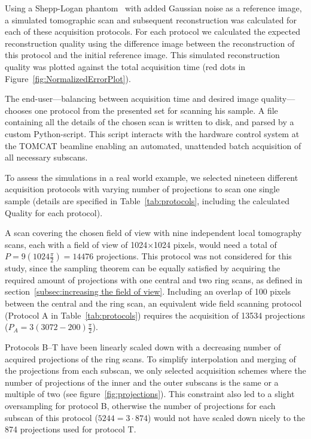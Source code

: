 Using a Shepp-Logan phantom~\cite{Shepp1974} with added Gaussian noise as a reference image, a simulated tomographic scan and subsequent reconstruction was calculated for each of these acquisition protocols. For each protocol we calculated the expected reconstruction quality using the difference image between the reconstruction of this protocol and the initial reference image. This simulated reconstruction quality was plotted against the total acquisition time (red dots in Figure~\ref{fig:NormalizedErrorPlot}).

The end-user---balancing between acquisition time and desired image quality---chooses one protocol from the presented set for scanning his sample. A file containing all the details of the chosen scan is written to disk, and parsed by a custom Python-script. This script interacts with the hardware control system at the \ac{TOMCAT} beamline enabling an automated, unattended batch acquisition of all necessary subscans.

To assess the simulations in a real world example, we selected nineteen different acquisition protocols with varying number of projections to scan one single sample (details are specified in Table~\ref{tab:protocols}, including the calculated Quality for each protocol).

A scan covering the chosen field of view with nine independent local tomography scans, each with a field of view of 1024$\times$1024 pixels, would need a total of $P=9(1024\frac{\pi}{2})=14476$ projections. This protocol was not considered for this study, since the sampling theorem can be equally satisfied by acquiring the required amount of projections with one central and two ring scans, as defined in section~\ref{subsec:increasing the field of view}. Including an overlap of 100 pixels between the central and the ring scan, an equivalent wide field scanning protocol (Protocol A in Table~\ref{tab:protocols}) requires the acquisition of 13534 projections ($P_{A}=3(3072-200)\frac{\pi}{2}$).

Protocols B--T have been linearly scaled down with a decreasing number of acquired projections of the ring scans. To simplify interpolation and merging of the projections from each subscan, we only selected acquisition schemes where the number of projections of the inner and the outer subscans is the same or a multiple of two (see figure~\ref{fig:projections}). This constraint also led to a slight oversampling for protocol B, otherwise the number of projections for each subscan of this protocol ($5244=3\cdot874$) would not have scaled down nicely to the 874 projections used for protocol T.

